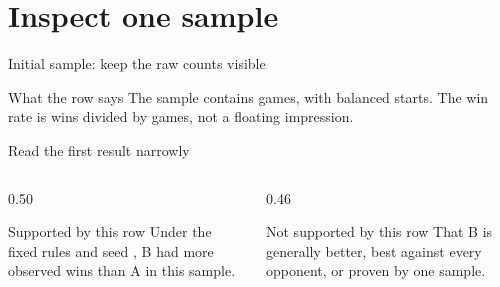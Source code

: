 \section{Inspect one sample}
\begin{frame}{Initial sample: keep the raw counts visible}
\begin{center}
\end{center}
\vspace{4pt}
\begin{block}{What the row says}
The sample contains \textbf{\NInitialGames} games, with balanced starts. The win rate is wins divided by games, not a floating impression.
\end{block}
\end{frame}

\begin{frame}[shrink=18]{Read the first result narrowly}
\begin{columns}[T]
\begin{column}{0.50\textwidth}
\begin{block}{Supported by this row}
Under the fixed rules and seed \NInitialSeed, B had more observed wins than A in this sample.
\end{block}
\end{column}
\begin{column}{0.46\textwidth}
\begin{block}{Not supported by this row}
That B is generally better, best against every opponent, or proven by one sample.
\end{block}
\end{column}
\end{columns}
\vspace{6pt}
\end{frame}

